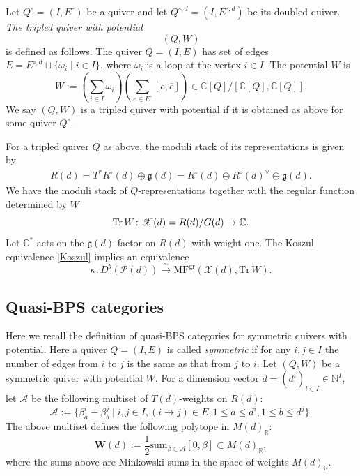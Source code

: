 \documentclass [11pt,oneside,a4paper,mathscr]{amsart}
\theoremstyle{definition}
\renewcommand{\leq}{\leqslant}
\newcommand{\X}{\mathscr{X}}
\newcommand{\Tr}{\mathop{\rm Tr}}
\begin{document}
Let $Q^\circ=(I, E^\circ)$ be a quiver and let $Q^{\circ, d}=(I, E^{\circ, d})$ be
its doubled quiver. 
\textit{The tripled quiver with potential} \[(Q,W)\] is defined as follows. 
The quiver $Q=(I, E)$ has set of edges $E=E^{\circ, d}\sqcup\{\omega_i \mid i\in I\}$, where $\omega_i$ is a loop at the vertex $i \in I$. The potential $W$ is 
\[W:=\left(\sum_{i\in I}\omega_i\right)
\left(\sum_{e\in E^\circ}[e, \overline{e}]\right)\in \mathbb{C}[Q]/[\mathbb{C}[Q], \mathbb{C}[Q]].\]
We say $(Q,W)$ is a tripled quiver with potential if it is obtained as above for some quiver $Q^\circ$.

For a tripled quiver $Q$ as above, the moduli stack 
of its representations is given by 
\begin{align*}
    R(d)=T^{\ast}R^{\circ}(d)\oplus \mathfrak{g}(d)=
    R^{\circ}(d) \oplus R^{\circ}(d)^{\vee} \oplus \mathfrak{g}(d). 
\end{align*}
We have the moduli stack of $Q$-representations 
together with the regular function determined by $W$
\[\Tr W \colon 
\X(d)=R(d)/G(d) \to \mathbb{C}.\]
Let $\mathbb{C}^{\ast}$ acts on the $\mathfrak{g}(d)$-factor on $R(d)$ 
with weight one.  
The Koszul equivalence \eqref{Koszul} implies an equivalence \begin{equation}\label{Koszulequivalence}
\kappa\colon D^b\left(\mathscr{P}(d)\right)\stackrel{\sim}{\to} \mathrm{MF}^{\mathrm{gr}}\left(\X(d), \mathrm{Tr}\,W\right).
\end{equation}









\subsection{Quasi-BPS categories}\label{subsec27}
Here we recall the definition of quasi-BPS categories for 
symmetric quivers with potential. 
Here a quiver $Q=(I, E)$ is called \textit{symmetric}
if for any $i, j \in I$ the number of edges from $i$ to $j$ is the same 
as that from $j$ to $i$. 
Let $(Q, W)$ be a symmetric quiver with potential $W$. 
For a dimension vector 
$d=(d^i)_{i\in I}\in\mathbb{N}^I$, 
let $\mathscr{A}$ be the following multiset of $T(d)$-weights on $R(d)$:
\[\mathscr{A}:=\{\beta^i_a-\beta^j_b \mid i,j\in I, 
    (i \to j) \in E, 1\leq a\leq d^i, 1\leq b\leq d^j\}.\] 
The above multiset defines the following polytope in $M(d)_{\mathbb{R}}$:
\begin{equation}\label{defpolytope}
\mathbf{W}(d):=\frac{1}{2}\mathrm{sum}_{\beta\in \mathscr{A}}[0, \beta]\subset M(d)_{\mathbb{R}},
\end{equation}
where the sums above are Minkowski sums in the space of weights $M(d)_{\mathbb{R}}$.
\end{document}
